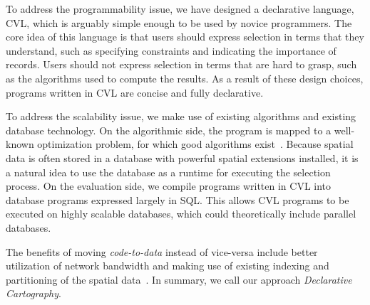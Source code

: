 To address the programmability issue, we have designed a declarative language, CVL, which is arguably simple enough to be used by novice programmers. The core idea of this language is that users should express selection in terms that they understand, such as specifying constraints and indicating the importance of records. Users should not express selection in terms that are hard to grasp, such as the algorithms used to compute the results. As a result of these design choices, programs written in CVL are concise and fully declarative.

To address the scalability issue, we make use of existing algorithms and existing database technology. On the algorithmic side, the program is mapped to a well-known optimization problem, for which good algorithms exist~\cite{rajagopalan1998primal}. Because spatial data is often stored in a database with powerful spatial extensions installed, it is a natural idea to use the database as a runtime for executing the selection process. On the evaluation side, we compile programs written in CVL into database programs expressed largely in SQL. This allows CVL programs to be executed on highly scalable databases, which could theoretically include parallel databases. 

The benefits of moving \emph{code-to-data} instead of vice-versa include better utilization of network bandwidth and making use of existing indexing and partitioning of the spatial data~\cite{Guttman1984:RTree,Hellerstein1995:GiST}. In summary, we call our approach \emph{Declarative Cartography}.

\vspace{5em}

